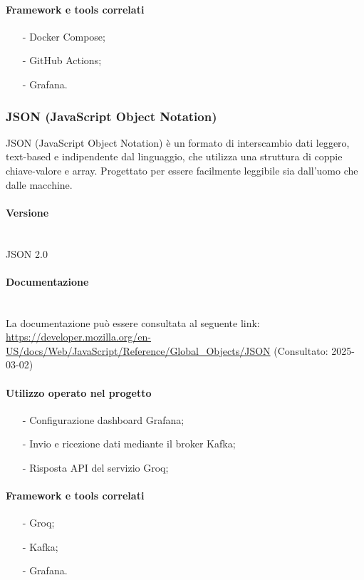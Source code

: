 \documentclass[10pt]{article}
\newcommand{\myparagraph}[1]{\paragraph{#1}\mbox{}\\\vspace{0.4em}}
\begin{document}
\begin{justify}
        \paragraph{Framework e tools correlati}
            \begin{itemize}
                \item[-] Docker Compose;
                \item[-] GitHub Actions;
                \item[-] Grafana.
            \end{itemize}

    \subsubsection{JSON (JavaScript Object Notation)}
    JSON (JavaScript Object Notation) è un formato di interscambio dati leggero, text-based e indipendente dal linguaggio, che utilizza una struttura di coppie 
    chiave-valore e array. Progettato per essere facilmente leggibile sia dall'uomo che dalle macchine.
        \myparagraph{Versione} 
            JSON 2.0
        \myparagraph{Documentazione}
        La documentazione può essere consultata al seguente link: \textcolor{blue}{\url{https://developer.mozilla.org/en-US/docs/Web/JavaScript/Reference/Global_Objects/JSON}} (Consultato: 2025-03-02)
        \paragraph{Utilizzo operato nel progetto}
            \begin{itemize}
                \item[-] Configurazione dashboard Grafana;
                \item[-] Invio e ricezione dati mediante il broker Kafka;
                \item[-] Risposta API del servizio Groq;
            \end{itemize}
        \paragraph{Framework e tools correlati}
            \begin{itemize}
                \item[-] Groq;
                \item[-] Kafka;
                \item[-] Grafana.
            \end{itemize}



\end{justify}
\end{document}
